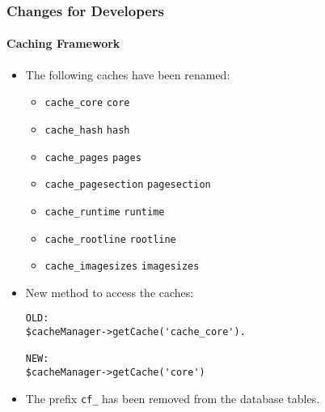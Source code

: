 
\begin{frame}[fragile]
	\frametitle{Changes for Developers}
	\framesubtitle{Caching Framework}

	\lstset{basicstyle=\tiny\ttfamily}

	\begin{itemize}
		\item The following caches have been renamed:

			\begin{itemize}\smaller
				\item \texttt{cache\_core} \textrightarrow\hspace{0.1cm}\texttt{core}
				\item \texttt{cache\_hash} \textrightarrow\hspace{0.1cm}\texttt{hash}
				\item \texttt{cache\_pages} \textrightarrow\hspace{0.1cm}\texttt{pages}
				\item \texttt{cache\_pagesection} \textrightarrow\hspace{0.1cm}\texttt{pagesection}
				\item \texttt{cache\_runtime} \textrightarrow\hspace{0.1cm}\texttt{runtime}
				\item \texttt{cache\_rootline} \textrightarrow\hspace{0.1cm}\texttt{rootline}
				\item \texttt{cache\_imagesizes} \textrightarrow\hspace{0.1cm}\texttt{imagesizes}
			\end{itemize}\normalsize

		\item New method to access the caches:

\begin{lstlisting}
OLD:
$cacheManager->getCache('cache_core').

NEW:
$cacheManager->getCache('core')
\end{lstlisting}

		\item The prefix \texttt{cf\_} has been removed from the database tables.
	\end{itemize}

\end{frame}

